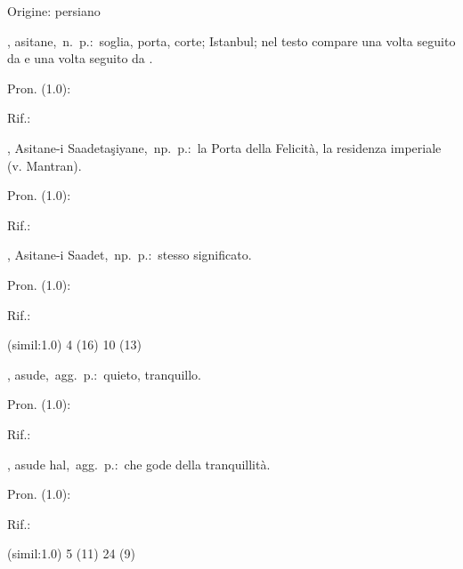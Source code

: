 \begin{glossario}{Origine: persiano}
\item[{\color{colorlowref}\spzrl{:CsitAn.H}},] {\sf asitane},\ n.\ p.:\ soglia,   porta, corte; Istanbul; nel testo compare una  volta   seguito  da     e  una  volta   seguito  da .
\begin{subvocedue}
\item[Pron. (1.0):] 
\item[Rif.:] 
\end{subvocedue}
\begin{subvocedue}
\item[\subglossariobullet] , {\sf Asitane-i  Saadetaşiyane},\ np.\ p.:\ la  Porta della         Felicità,        la         residenza        imperiale (v. Mantran).
\begin{subvocedue}
\item[Pron. (1.0):] 
\item[Rif.:] 
\end{subvocedue}
\item[\subglossariobullet] , {\sf Asitane-i Saadet},\ np.\ p.:\ stesso significato.
\begin{subvocedue}
\item[Pron. (1.0):] 
\item[Rif.:] 
\end{subvocedue}
\item[(simil:1.0)]   4 (16) 10 (13)
\end{subvocedue}
\item[{\color{colorlowref}\spzrl{:CsUd.H}},] {\sf asude},\ agg.\ p.:\ quieto, tranquillo.
\begin{subvocedue}
\item[Pron. (1.0):] 
\item[Rif.:] 
\end{subvocedue}
\begin{subvocedue}
\item[\subglossariobullet] , {\sf asude hal},\ agg.\ p.:\ che gode della tranquillità.
\begin{subvocedue}
\item[Pron. (1.0):] 
\item[Rif.:] 
\end{subvocedue}
\item[(simil:1.0)]   5 (11) 24 (9)
\end{subvocedue}



\end{glossario}

